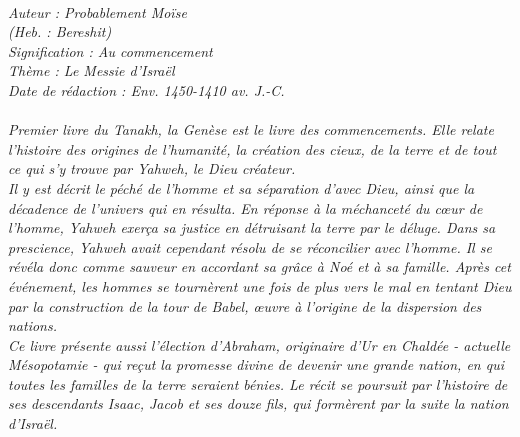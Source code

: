 \BFont
\noindent\hrulefill
{\footnotesize
\textit{
\bigskip
{\centering{}
\\Auteur : Probablement Moïse
\\(Heb. : Bereshit)
\\Signification : Au commencement
\\Thème : Le Messie d'Israël
\\Date de rédaction : Env. 1450-1410 av. J.-C.\\}
}
\textit{
\\Premier livre du Tanakh, la Genèse est le livre des commencements.
Elle relate l'histoire des origines de l'humanité, la création des cieux, de la terre et de tout ce qui s'y trouve par Yahweh, le Dieu créateur.
\\Il y est décrit le péché de l'homme et sa séparation d'avec Dieu, ainsi que la décadence de l'univers qui en résulta. En réponse à la méchanceté du cœur de l'homme, Yahweh exerça sa justice en détruisant la terre par le déluge.
Dans sa prescience, Yahweh avait cependant résolu de se réconcilier avec l'homme. Il se révéla donc comme sauveur en accordant sa grâce à Noé et à sa famille. Après cet événement, les hommes se tournèrent une fois de plus vers le mal en tentant Dieu par la construction de la tour de Babel, œuvre à l'origine de la dispersion des nations.
\\Ce livre présente aussi l'élection d'Abraham, originaire d'Ur en Chaldée - actuelle Mésopotamie - qui reçut la promesse divine de devenir une grande nation, en qui toutes les familles de la terre seraient bénies. Le récit se poursuit par l'histoire de ses descendants Isaac, Jacob et ses douze fils, qui formèrent par la suite la nation d'Israël.\bigskip
}
}
\par\nobreak\noindent\hrulefill
